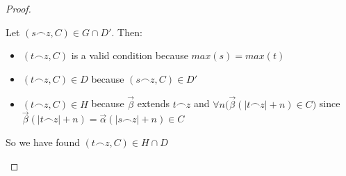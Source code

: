 \documentclass[a4paper,12pt]{article}
\theoremstyle{plain}
\theoremstyle{definition}
\theoremstyle{remark}
\begin{document}
\begin{proof}
\begin{itemize}
			Let $(s \frown z, C) \in G \cap D'$. Then:
			\begin{itemize}
				\item $(t \frown z,C)$ is a valid condition because $max(s) = max(t)$
				\item $(t \frown z,C) \in D$ because $(s \frown z,C) \in D'$ 
				\item $(t \frown z,C) \in H$ because $\vec{\beta}$ extends $t \frown z$ and 
					$\forall n \big(\vec{\beta}(|t \frown z|+n) \in C \big)$ since 
					$\vec{\beta}(|t \frown z| +n) = \vec{\alpha}(|s \frown z| +n) \in C$
			\end{itemize}

			So we have found $(t \frown z, C) \in H \cap D$

	\end{itemize}

\end{proof}
\end{document}
